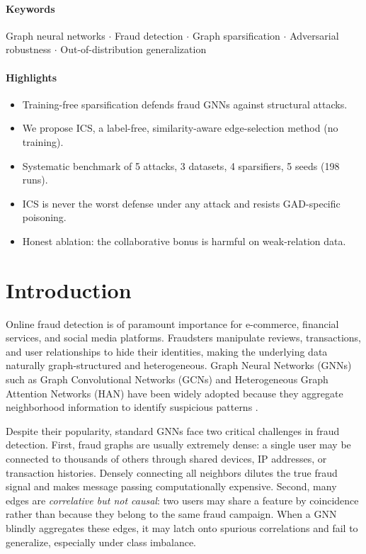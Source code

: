 \documentclass[11pt]{article}
\begin{document}
\paragraph{Keywords}
Graph neural networks $\cdot$ Fraud detection $\cdot$ Graph sparsification $\cdot$ Adversarial robustness $\cdot$ Out-of-distribution generalization

\paragraph{Highlights}
\begin{itemize}
\item Training-free sparsification defends fraud GNNs against structural attacks.
\item We propose ICS, a label-free, similarity-aware edge-selection method (no training).
\item Systematic benchmark of 5 attacks, 3 datasets, 4 sparsifiers, 5 seeds (198 runs).
\item ICS is never the worst defense under any attack and resists GAD-specific poisoning.
\item Honest ablation: the collaborative bonus is harmful on weak-relation data.
\end{itemize}

\section{Introduction}\label{sec:intro}

Online fraud detection is of paramount importance for e-commerce, financial services, and social media platforms. Fraudsters manipulate reviews, transactions, and user relationships to hide their identities, making the underlying data naturally graph-structured and heterogeneous. Graph Neural Networks (GNNs) such as Graph Convolutional Networks (GCNs) \cite{kipf2017gcn} and Heterogeneous Graph Attention Networks (HAN) \cite{wang2019han} have been widely adopted because they aggregate neighborhood information to identify suspicious patterns \cite{dou2020caregnn,liu2021fraudreview}.

Despite their popularity, standard GNNs face two critical challenges in fraud detection. First, fraud graphs are usually extremely dense: a single user may be connected to thousands of others through shared devices, IP addresses, or transaction histories. Densely connecting all neighbors dilutes the true fraud signal and makes message passing computationally expensive. Second, many edges are \emph{correlative but not causal}: two users may share a feature by coincidence rather than because they belong to the same fraud campaign. When a GNN blindly aggregates these edges, it may latch onto spurious correlations and fail to generalize, especially under class imbalance.
\end{document}
